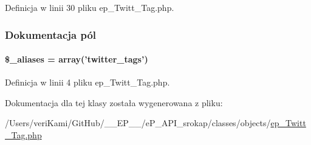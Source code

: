 Definicja w linii 30 pliku ep\-\_\-\-Twitt\-\_\-\-Tag.\-php.



\subsubsection{Dokumentacja pól}
\hypertarget{classep___twitt___tag_ab4e31d75f0bc5d512456911e5d01366b}{
\paragraph[{\$\-\_\-aliases}]{\setlength{\rightskip}{0pt plus 5cm}\$\-\_\-aliases = array('twitter\-\_\-tags')}}\label{classep___twitt___tag_ab4e31d75f0bc5d512456911e5d01366b}


Definicja w linii 4 pliku ep\-\_\-\-Twitt\-\_\-\-Tag.\-php.



Dokumentacja dla tej klasy została wygenerowana z pliku\-:\begin{DoxyCompactItemize}
\item 
/\-Users/veri\-Kami/\-Git\-Hub/\-\_\-\-\_\-\-E\-P\-\_\-\-\_\-/e\-P\-\_\-\-A\-P\-I\-\_\-srokap/classes/objects/\hyperlink{ep___twitt___tag_8php}{ep\-\_\-\-Twitt\-\_\-\-Tag.\-php}\end{DoxyCompactItemize}
